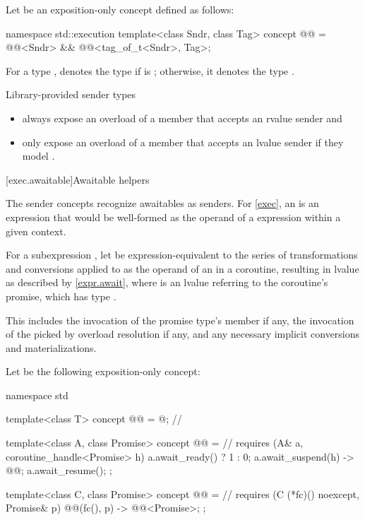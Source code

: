 \pnum
Let  be an exposition-only concept defined as follows:
\begin{codeblock}
namespace std::execution {
  template<class Sndr, class Tag>
  concept @@ =
    @@<Sndr> &&
    @@<tag_of_t<Sndr>, Tag>;
}
\end{codeblock}

\pnum
For a type ,
 denotes the type 
if  is \cv{} ;
otherwise, it denotes the type .

\pnum
Library-provided sender types
\begin{itemize}
\item
always expose an overload of a member 
that accepts an rvalue sender and
\item
only expose an overload of a member 
that accepts an lvalue sender if they model .
\end{itemize}

[exec.awaitable]{Awaitable helpers}

\pnum
The sender concepts recognize awaitables as senders.
For \ref{exec}, an  is an expression
that would be well-formed as the operand of a  expression
within a given context.

\pnum
For a subexpression ,
let  be expression-equivalent to
the series of transformations and conversions applied to 
as the operand of an  in a coroutine,
resulting in lvalue  as described by \ref{expr.await},
where  is an lvalue referring to the coroutine's promise,
which has type .
\begin{note}
This includes the invocation of
the promise type's  member if any,
the invocation of the 
picked by overload resolution if any, and
any necessary implicit conversions and materializations.
\end{note}

\pnum
Let  be the following exposition-only concept:
\begin{codeblock}
namespace std {
  template<class T>
  concept @@ = @\seebelow@;                     // \expos

  template<class A, class Promise>
  concept @@ =                                          // \expos
    requires (A& a, coroutine_handle<Promise> h) {
      a.await_ready() ? 1 : 0;
      { a.await_suspend(h) } -> @@;
      a.await_resume();
    };

  template<class C, class Promise>
  concept @@ =                                        // \expos
    requires (C (*fc)() noexcept, Promise& p) {
      { @@(fc(), p) } -> @@<Promise>;
    };
}
\end{codeblock}

